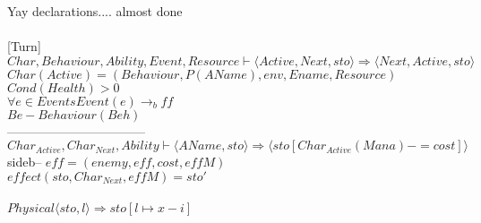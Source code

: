 	Yay declarations.... almost done
	\\\\
	
	[Turn]\\
	$Char, Behaviour, Ability, Event, Resource \vdash \langle Active, Next, sto \rangle \Rightarrow \langle Next, Active, sto \rangle$\\
	$Char(Active) = (Behaviour, P(AName), env, Ename, Resource)$\\
	$Cond(Health) > 0$\\
	$\forall e \in Events Event(e) \rightarrow_b ff$\\
	$Be - Behaviour(Beh)$\\
	---------------------------------\\
	$Char_{Active}, Char_{Next}, Ability \vdash \langle AName, sto \rangle \Rightarrow \langle sto[Char_{Active}(Mana) -= cost] \rangle$\\
	sideb-- $eff = (enemy, eff, cost, effM)$\\
	$effect(sto, Char_{Next}, effM) = sto'$\\\\
	
	
	$Physical \langle sto, l \rangle \Rightarrow sto[l \mapsto x - i]$\\
	
\pagebreak
